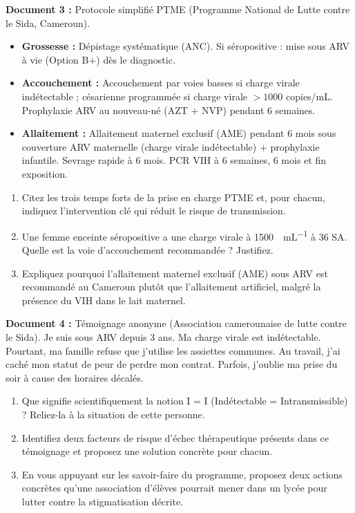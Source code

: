 \documentclass[11pt]{article}
\begin{document}
\begin{exercice}
\textbf{Document 3 :} Protocole simplifié PTME (Programme National de Lutte contre le Sida, Cameroun).
\begin{itemize}
    \item \textbf{Grossesse :} Dépistage systématique (ANC). Si séropositive : mise sous ARV à vie (Option B+) dès le diagnostic.
    \item \textbf{Accouchement :} Accouchement par voies basses si charge virale indétectable ; césarienne programmée si charge virale $> 1000$ copies/mL. Prophylaxie ARV au nouveau-né (AZT + NVP) pendant 6 semaines.
    \item \textbf{Allaitement :} Allaitement maternel exclusif (AME) pendant 6 mois sous couverture ARV maternelle (charge virale indétectable) + prophylaxie infantile. Sevrage rapide à 6 mois. PCR VIH à 6 semaines, 6 mois et fin exposition.
\end{itemize}
\begin{enumerate}
    \item Citez les trois temps forts de la prise en charge PTME et, pour chacun, indiquez l'intervention clé qui réduit le risque de transmission.
    \item Une femme enceinte séropositive a une charge virale à \SI{1500}{\per\milli\liter} à 36 SA. Quelle est la voie d'accouchement recommandée ? Justifiez.
    \item Expliquez pourquoi l'allaitement maternel exclusif (AME) sous ARV est recommandé au Cameroun plutôt que l'allaitement artificiel, malgré la présence du VIH dans le lait maternel.
\end{enumerate}
\end{exercice}

\begin{exercice}
\textbf{Document 4 :} Témoignage anonyme (Association camerounaise de lutte contre le Sida). \og Je suis sous ARV depuis 3 ans. Ma charge virale est indétectable. Pourtant, ma famille refuse que j'utilise les assiettes communes. Au travail, j'ai caché mon statut de peur de perdre mon contrat. Parfois, j'oublie ma prise du soir à cause des horaires décalés. \fg
\begin{enumerate}
    \item Que signifie scientifiquement la notion \og I = I \fg (Indétectable = Intransmissible) ? Reliez-la à la situation de cette personne.
    \item Identifiez deux facteurs de risque d'échec thérapeutique présents dans ce témoignage et proposez une solution concrète pour chacun.
    \item En vous appuyant sur les savoir-faire du programme, proposez deux actions concrètes qu'une association d'élèves pourrait mener dans un lycée pour lutter contre la stigmatisation décrite.
\end{enumerate}
\end{exercice}
\end{document}
